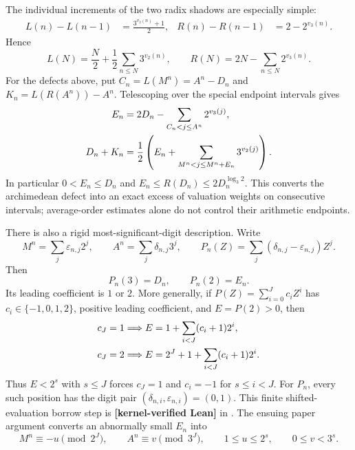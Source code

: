 \documentclass[11pt,oneside]{article}
\theoremstyle{definition}
\theoremstyle{remark}
\newcommand{\lean}[1]{\texttt{\detokenize{#1}}}
\newcommand{\statuslean}{\textcolor{leanblue}{\textbf{[kernel-verified Lean]}}}
\begin{document}
The individual increments of the two radix shadows are especially simple:
\begin{align}
 L(n)-L(n-1)&=\frac{3^{v_2(n)}+1}{2},&
 R(n)-R(n-1)&=2-2^{v_3(n)}.
 \label{carry:eq-radix-increments}
\end{align}
Hence
\begin{equation}
 L(N)=\frac N2+\frac12\sum_{n\le N}3^{v_2(n)},
 \qquad
 R(N)=2N-\sum_{n\le N}2^{v_3(n)}.
 \label{carry:eq-radix-summatory}
\end{equation}
For the defects above, put $C_n=L(M^n)=A^n-D_n$ and
$K_n=L(R(A^n))-A^n$.  Telescoping over the special endpoint intervals gives
\begin{align}
 E_n&=2D_n-\sum_{C_n<j\le A^n}2^{v_3(j)},\notag\\
 D_n+K_n&=\frac12\left(E_n+
   \sum_{M^n<j\le M^n+E_n}3^{v_2(j)}\right).
 \label{carry:eq-defect-intervals}
\end{align}
In particular $0<E_n\le D_n$ and $E_n\le R(D_n)\le2D_n^{\log_3 2}$.  This converts
the archimedean defect into an exact excess of valuation weights on consecutive intervals;
average-order estimates alone do not control their arithmetic endpoints.

There is also a rigid most-significant-digit description.  Write
\begin{equation}
 M^n=\sum_j\varepsilon_{n,j}2^j,\qquad
 A^n=\sum_j\delta_{n,j}3^j,\qquad
 P_n(Z)=\sum_j(\delta_{n,j}-\varepsilon_{n,j})Z^j.
 \label{carry:eq-digit-difference-polynomial}
\end{equation}
Then
\begin{equation}
 P_n(3)=D_n,\qquad P_n(2)=E_n.
 \label{carry:eq-two-word-evaluations}
\end{equation}
Its leading coefficient is $1$ or $2$.  More generally, if
$P(Z)=\sum_{i=0}^Jc_iZ^i$ has $c_i\in\{-1,0,1,2\}$, positive leading coefficient,
and $E=P(2)>0$, then
\begin{align}
 c_J=1&\Longrightarrow E=1+\sum_{i<J}(c_i+1)2^i,\notag\\
 c_J=2&\Longrightarrow E=2^J+1+\sum_{i<J}(c_i+1)2^i.
 \label{carry:eq-borrow-expansion}
\end{align}
Thus $E<2^s$ with $s\le J$ forces $c_J=1$ and
$c_i=-1$ for $s\le i<J$.  For $P_n$, every such position has the digit pair
$(\delta_{n,i},\varepsilon_{n,i})=(0,1)$.  This finite shifted-evaluation borrow step is
\statuslean{} in \lean{BorrowBlockCore}.  The ensuing paper argument converts an abnormally
small $E_n$ into
\begin{equation}
 M^n\equiv-u\pmod{2^J},\qquad A^n\equiv v\pmod{3^J},\qquad
 1\le u\le2^s,\qquad0\le v<3^s.
 \label{carry:eq-borrow-congruences}
\end{equation}
\end{document}
